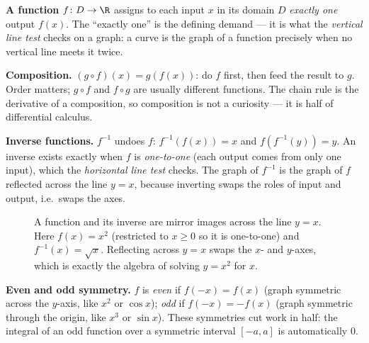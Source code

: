 \textbf{A function} $f\colon D \to \R$ assigns to each input $x$ in its domain $D$
\emph{exactly one} output $f(x)$. The ``exactly one'' is the defining demand --- it
is what the \emph{vertical line test} checks on a graph: a curve is the graph of a
function precisely when no vertical line meets it twice.

\textbf{Composition.} $(g\circ f)(x) = g(f(x))$: do $f$ first, then feed the result
to $g$. Order matters; $g\circ f$ and $f\circ g$ are usually different functions.
The chain rule is the derivative of a composition, so composition is not a
curiosity --- it is half of differential calculus.

\textbf{Inverse functions.} $f^{-1}$ undoes $f$: $f^{-1}(f(x)) = x$ and
$f(f^{-1}(y)) = y$. An inverse exists exactly when $f$ is \emph{one-to-one} (each
output comes from only one input), which the \emph{horizontal line test} checks.
The graph of $f^{-1}$ is the graph of $f$ reflected across the line $y=x$, because
inverting swaps the roles of input and output, i.e.\ swaps the axes.

\begin{figure}[H]
\centering
{}
\caption{A function and its inverse are mirror images across the line $y=x$. Here
$f(x)=x^2$ (restricted to $x\ge0$ so it is one-to-one) and $f^{-1}(x)=\sqrt x$.
Reflecting across $y=x$ swaps the $x$- and $y$-axes, which is exactly the algebra
of solving $y=x^2$ for $x$.}
\label{ch40:fig-inverse}
\end{figure}

\textbf{Even and odd symmetry.} $f$ is \emph{even} if $f(-x)=f(x)$ (graph
symmetric across the $y$-axis, like $x^2$ or $\cos x$); \emph{odd} if
$f(-x)=-f(x)$ (graph symmetric through the origin, like $x^3$ or $\sin x$). These
symmetries cut work in half: the integral of an odd function over a symmetric
interval $[-a,a]$ is automatically $0$.

